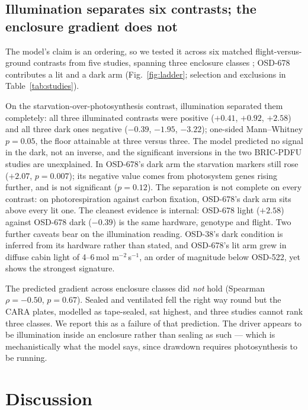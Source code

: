 \documentclass[pdflatex,sn-nature]{sn-jnl}
\begin{document}
\subsection{Illumination separates six contrasts; the enclosure gradient does not}

The model's claim is an ordering, so we tested it across six matched flight-versus-ground
contrasts from five studies, spanning three enclosure classes \citep{osd38,osd321,osd678,osd427};
OSD-678 contributes a lit and a dark arm
(Fig.~\ref{fig:ladder}; selection and exclusions in Table~\ref{tab:studies}).

On the starvation-over-photosynthesis contrast, illumination separated them completely:
all three illuminated contrasts were positive ($+0.41$, $+0.92$, $+2.58$) and all three dark
ones negative ($-0.39$, $-1.95$, $-3.22$); one-sided Mann--Whitney $p = 0.05$, the floor
attainable at three versus three. The model predicted no signal in the dark, not an inverse,
and the significant inversions in the two BRIC-PDFU studies are unexplained. In OSD-678's dark
arm the starvation markers still rose ($+2.07$, $p = 0.007$); its negative value comes from
photosystem genes rising further, and is not significant ($p = 0.12$). The separation is not
complete on every contrast: on photorespiration against carbon fixation, OSD-678's dark arm
sits above every lit one. The cleanest evidence is internal: OSD-678 light ($+2.58$) against
OSD-678 dark ($-0.39$) is the same hardware, genotype and flight. Two further caveats bear on
the illumination reading. OSD-38's dark condition is inferred from its hardware rather than
stated, and OSD-678's lit arm grew in diffuse cabin light of 4--6\,\textmu mol
m$^{-2}$\,s$^{-1}$, an order of magnitude below OSD-522, yet shows the strongest signature.

The predicted gradient across enclosure classes did \emph{not} hold (Spearman
$\rho = -0.50$, $p = 0.67$). Sealed and ventilated fell the right way round but the CARA
plates, modelled as tape-sealed, sat highest, and three studies cannot rank three classes. We report this as a failure of
that prediction. The driver appears to be illumination inside an enclosure rather than sealing
as such --- which is mechanistically what the model says, since drawdown requires
photosynthesis to be running.

\section{Discussion}\label{sec:discussion}
\end{document}
